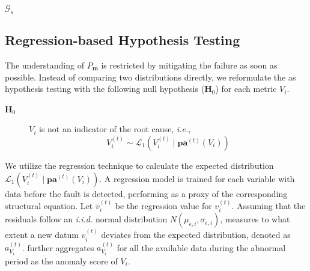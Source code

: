 \begin{algorithm}[tb]
\begin{algorithmic}[1]
				\label{line:accumulate-error}
			\ENDIF
				\label{line:gather-metrics-for-children}
			\ELSE
			\ENDIF
		\ENDFOR
		\RETURN $\mathcal{G}_{s}$
	\end{algorithmic}
\end{algorithm}

\subsection{Regression-based Hypothesis Testing}

The understanding of $P_{\mathbf{m}}$ is restricted by mitigating the failure as soon as possible.
Instead of comparing two distributions directly, we reformulate the  as hypothesis testing with the following null hypothesis ($\mathbf{H}_{0}$) for each metric $V_{i}$.

\begin{description}
	\item[$\mathbf{H}_{0}$]  $V_{i}$ is not an indicator of the root cause, \textit{i.e.}, $$V_{i}^{(t)} \sim \mathcal{L}_{1}\left(V_{i}^{(t)} \mid \mathbf{pa}^{(t)}(V_{i})\right)$$
\end{description}

We utilize the regression technique to calculate the expected distribution $\mathcal{L}_{1}\left(V_{i}^{(t)} \mid \mathbf{pa}^{(t)}(V_{i})\right)$.
A regression model is trained for each variable with data before the fault is detected, performing as a proxy of the corresponding structural equation.
Let $\bar{v}_{i}^{(t)}$ be the regression value for $v_{i}^{(t)}$.
Assuming that the residuals follow an \textit{i.i.d.} normal distribution $N(\mu_{\epsilon,i}, \sigma_{\epsilon,i})$,  measures to what extent a new datum $v_{i}^{(t)}$ deviates from the expected distribution, denoted as $a_{V_{i}}^{(t)}$.
 further aggregates $a_{V_{i}}^{(t)}$ for all the available data during the abnormal period as the anomaly score of $V_{i}$.


